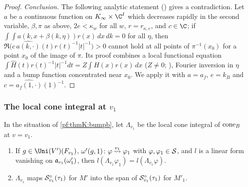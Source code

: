 \begin{proof}
\emph{Conclusion.} The following analytic statement () gives a
contradiction. Let $a$ be a continuous function on $K_\infty\times\C^I$ which decreases rapidly in the second variable,
$\beta,\pi$ as above, $2e<\kappa_w$ for all $w$, $r=r_{\kappa,e}$, and $c\in\C$; if $\int\int a(k,x+\beta(k,\eta))r(x)\,dx\,
dk=0$ for all $\eta$, then $\Re\bigl(c\,\widehat{a(k,\cdot)}(t)r(t)^{-1}|t|^{-1}\bigr)>0$ cannot hold at all points of
$\pi^{-1}(x_0)$ for a point $x_0$ of the image of $\pi$. Its proof combines a local functional equation
$\int\widehat H(t)r(t)^{-1}|t|^{-1}dt=Z\int H(x)r(x)\,dx$ ($Z\ne0$; ),
Fourier inversion in $\eta$ and a bump function concentrated near $x_0$. We apply it with $a=a_f$, $e=k_B$ and
$c=\widehat{a_f(1,\cdot)}(1)^{-1}$.
\end{proof}

\subsubsection{The local cone integral at $v_1$}\label{sec:pf:thmK:flocb}

\begin{lemma}\label{pf:thmK:flocb}
In the situation of \cref{pf:thmK:bumpb}, let $\Lambda_{v_1}$ be the local cone integral of $\operatorname{cone}_B$ at $v=v_1$.
\begin{enumerate}
\item If $g\in\Uni(V')(F_{v_1})$, $\omega'(g,1)\colon\varphi\mathrel{\stackrel{v_1}{\leadsto}}\varphi_1$ with $\varphi,\varphi_1\in\mathcal{S}$, and
$l$ is a linear form vanishing on $\mathfrak{a}_{v_1}(\omega'_1)$, then $l(\Lambda_{v_1}\varphi_1)=l(\Lambda_{v_1}\varphi)$.
\item $\Lambda_{v_1}$ maps $\mathcal{S}^{\circ}_{v_1}(\tau_1)$ for $M'$ into the span of $\mathcal{S}^{\circ}_{v_1}(\tau_1)$ for $M'_1$.
\end{enumerate}
\end{lemma}

